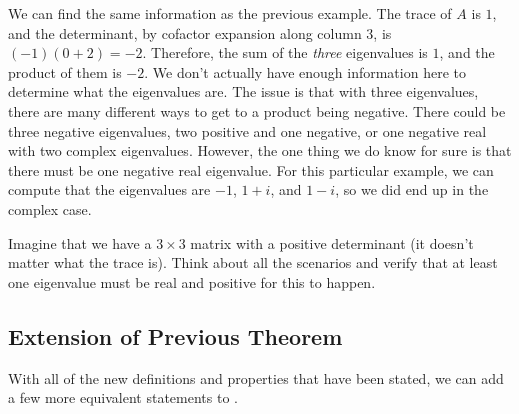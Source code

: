 \documentclass{ximera}
\begin{document}
\begin{exampleSol}
    We can find the same information as the previous example. The trace of $A$ is $1$, and the determinant, by cofactor expansion along column 3, is $(-1)(0 + 2) = -2$. Therefore, the sum of the \emph{three} eigenvalues is $1$, and the product of them is $-2$. We don't actually have enough information here to determine what the eigenvalues are. The issue is that with three eigenvalues, there are many different ways to get to a product being negative. There could be three negative eigenvalues, two positive and one negative, or one negative real with two complex eigenvalues. However, the one thing we do know for sure is that there must be one negative real eigenvalue. For this particular example, we can compute that the eigenvalues are $-1$, $1+i$, and $1-i$, so we did end up in the complex case. 
\end{exampleSol}

\begin{exercise}
    Imagine that we have a $3 \times 3$ matrix with a positive determinant (it doesn't matter what the trace is). Think about all the scenarios and verify that at least one eigenvalue must be real and positive for this to happen. 
\end{exercise}


\subsection{Extension of Previous Theorem}

With all of the new definitions and properties that have been stated, we can add a few more equivalent statements to . 
\end{document}
